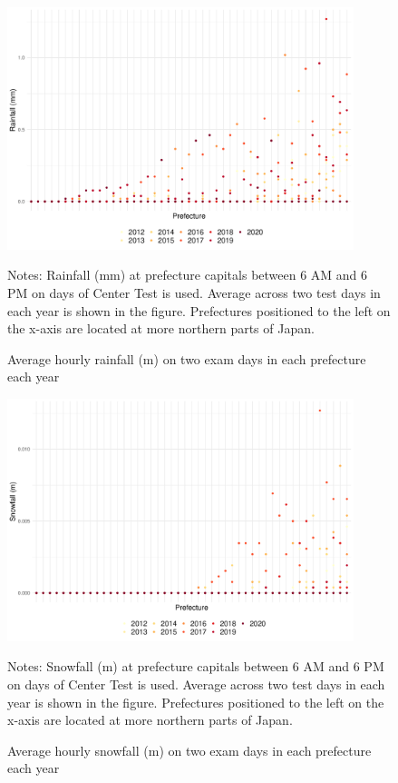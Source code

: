 \documentclass[12pt,letterpaper]{article}
\begin{document}
\begin{figure}[H]
  \centering
  \caption{Average hourly rainfall (m) on two exam days in each prefecture each year}
  \includegraphics[width = 0.9\textwidth]{../Output/images/rainfall_diff.pdf}
  \label{fig:rainfall_diff}
  \footnotesize
  \begin{tablenotes}
    \item Notes:
      Rainfall (mm) at prefecture capitals between 6 AM and 6 PM on days of Center Test is used.
      Average across two test days in each year is shown in the figure.
      Prefectures positioned to the left on the x-axis are located at more northern parts of Japan.
  \end{tablenotes}
\end{figure}

\begin{figure}[H]
  \centering
  \caption{Average hourly snowfall (m) on two exam days in each prefecture each year}
  \includegraphics[width = 0.9\textwidth]{../Output/images/snowfall_diff.pdf}
  \label{fig:snowfall_diff}
  \footnotesize
  \begin{tablenotes}
    \item Notes:
      Snowfall (m) at prefecture capitals between 6 AM and 6 PM on days of Center Test is used.
      Average across two test days in each year is shown in the figure.
      Prefectures positioned to the left on the x-axis are located at more northern parts of Japan.
  \end{tablenotes}
\end{figure}
\end{document}
